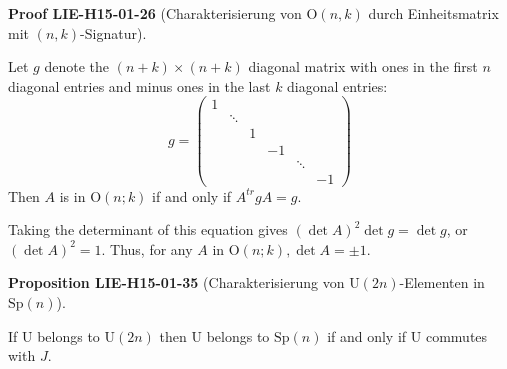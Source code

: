\documentclass[10pt, letterpaper]{article}
\newcommand{\Sp}{\mathrm{Sp}}
\newcommand{\Ogroup}{\mathrm{O}} %
\newcommand{\U}{\mathrm{U}}
\newcommand{\CustomHeading}[3]{%
  \par\medskip\noindent%
  \textbf{#1 #2} \textnormal{(#3)}.\enskip%
}
\newenvironment{PROP}[2]{\CustomHeading{Proposition}{#1}{#2}}{}
\newenvironment{PROOF}[2]{\CustomHeading{Proof}{#1}{#2}}{}
\begin{document}
\begin{PROOF}{LIE-H15-01-26}{Charakterisierung von $\Ogroup(n,k)$ durch Einheitsmatrix mit $(n,k)$-Signatur}
Let $g$ denote the $(n+k) \times(n+k)$ diagonal matrix with ones in the first $n$ diagonal entries and minus ones in the last $k$ diagonal entries:
$$
g=\left(\begin{array}{llllll}
1 & & & & & \\
& \ddots & & & & \\
& & 1 & & & \\
& & & -1 & & \\
& & & & \ddots & \\
& & & & & -1
\end{array}\right)
$$
Then $A$ is in $\mathrm{O}(n ; k)$ if and only if $A^{t r} g A=g$. 

Taking the determinant of this equation gives $(\operatorname{det} A)^{2} \operatorname{det} g=\operatorname{det} g$, or $(\operatorname{det} A)^{2}=1$. Thus, for any $A$ in $\mathrm{O}(n ; k), \operatorname{det} A= \pm 1$.
\end{PROOF}

\begin{PROP}{LIE-H15-01-35}{Charakterisierung von $\U(2n)$-Elementen in $\Sp(n)$}
If $\U$ belongs to $\U(2n)$ then $\U$ belongs to $\Sp(n)$ if and only if $\U$ commutes with $J$.
\end{PROP}
\end{document}
